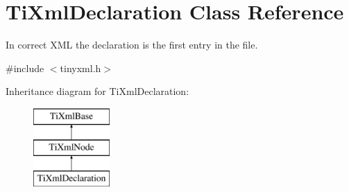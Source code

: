 \hypertarget{class_ti_xml_declaration}{
\section{TiXmlDeclaration Class Reference}
\label{class_ti_xml_declaration}
}


In correct XML the declaration is the first entry in the file.  




{\ttfamily \#include $<$tinyxml.h$>$}

Inheritance diagram for TiXmlDeclaration:\begin{figure}[H]
\begin{center}
\leavevmode
\includegraphics[height=3.000000cm]{class_ti_xml_declaration}
\end{center}
\end{figure}
